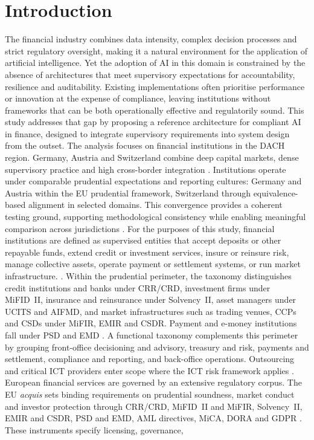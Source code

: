 \documentclass[oneside,10pt]{swissi}
\begin{document}
\section{Introduction}
The financial industry combines data intensity, complex decision processes and strict regulatory oversight, making it a natural environment for the application of artificial intelligence. Yet the adoption of AI in this domain is constrained by the absence of architectures that meet supervisory expectations for accountability, resilience and auditability. Existing implementations often prioritise performance or innovation at the expense of compliance, leaving institutions without frameworks that can be both operationally effective and regulatorily sound. This study addresses that gap by proposing a reference architecture for compliant AI in finance, designed to integrate supervisory requirements into system design from the outset. The analysis focuses on financial institutions in the DACH region. Germany, Austria and Switzerland combine deep capital markets, dense supervisory practice and high cross-border integration \cite{ecbFISEA2024,bisIBS2025,sifEU2025}. Institutions operate under comparable prudential expectations and reporting cultures: Germany and Austria within the EU prudential framework, Switzerland through equivalence-based alignment in selected domains. This convergence provides a coherent testing ground, supporting methodological consistency while enabling meaningful comparison across jurisdictions \cite{crr2013,crd2013,its2021451,ec_equivalence,sifEU2025}. For the purposes of this study, financial institutions are defined as supervised entities that accept deposits or other repayable funds, extend credit or investment services, insure or reinsure risk, manage collective assets, operate payment or settlement systems, or run market infrastructure. \cite{crr2013,mifid2_2014,solvency2_2009,ucits_2009,aifmd_2011,psd2_2015,emir_2012,csdr_2014,mifir_2014}. Within the prudential perimeter, the taxonomy distinguishes credit institutions and banks under CRR/CRD, investment firms under MiFID~II, insurance and reinsurance under Solvency~II, asset managers under UCITS and AIFMD, and market infrastructures such as trading venues, CCPs and CSDs under MiFIR, EMIR and CSDR. Payment and e-money institutions fall under PSD and EMD \cite{crr2013,crd2013,mifid2_2014,mifir_2014,solvency2_2009,emir_2012,csdr_2014,psd2_2015,emd2_2009,ucits_2009,aifmd_2011}. A functional taxonomy complements this perimeter by grouping front-office decisioning and advisory, treasury and risk, payments and settlement, compliance and reporting, and back-office operations. Outsourcing and critical ICT providers enter scope where the ICT risk framework applies \cite{dora_2022}. European financial services are governed by an extensive regulatory corpus. The EU \emph{acquis} sets binding requirements on prudential soundness, market conduct and investor protection through CRR/CRD, MiFID~II and MiFIR, Solvency~II, EMIR and CSDR, PSD and EMD, AML directives, MiCA, DORA and GDPR \cite{crr2013,crd2013,mifid2_2014,mifir_2014,solvency2_2009,emir_2012,csdr_2014,psd2_2015,emd2_2009,amld4_2015,amld5_2018,mica_2023,dora_2022,gdpr_2016}. These instruments specify licensing, governance, 
\end{document}
